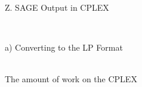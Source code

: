 \documentclass[11pt]{report}
\begin{document}
\begin{LARGE}
Z. SAGE Output in CPLEX
\end{LARGE}
\\


\begin{large}
a) Converting to the LP Format
\end{large}
\\

The amount of work on the CPLEX
\end{document}
